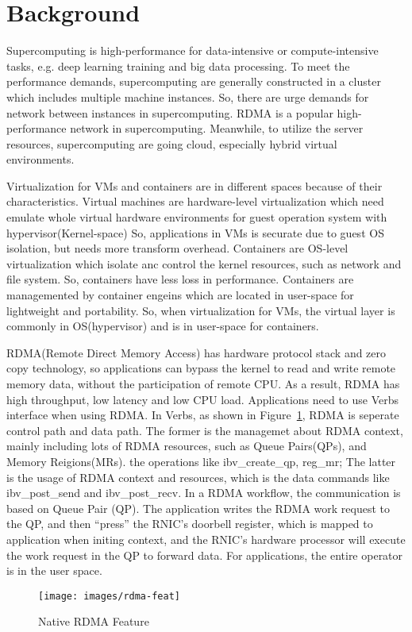 \section{Background}

Supercomputing is high-performance for data-intensive or compute-intensive tasks, e.g. deep learning training and big data processing. To meet the performance demands, supercomputing are generally constructed in a cluster which includes multiple machine instances. So, there are urge demands for network between instances in supercomputing. RDMA is a popular high-performance network in supercomputing. Meanwhile, to utilize the server resources, supercomputing are going cloud, especially hybrid virtual environments.

Virtualization for VMs and containers are in different spaces because of their characteristics. Virtual machines are hardware-level virtualization which need emulate whole virtual hardware environments for guest operation system with hypervisor(Kernel-space) So, applications in VMs is securate due to guest OS isolation, but needs more transform overhead. Containers are OS-level virtualization which isolate anc control the kernel resources, such as network and file system. So, containers have less loss in performance. Containers are managemented by container engeins which are located in user-space for lightweight and portability. So, when virtualization for VMs, the virtual layer is commonly in OS(hypervisor) and is in user-space for containers.

RDMA(Remote Direct Memory Access) has hardware protocol stack and zero copy technology, so applications can bypass the kernel to read and write remote memory data, without the participation of remote CPU. As a result, RDMA has high throughput, low latency and low CPU load. Applications need to use Verbs interface when using RDMA. In Verbs, as shown in Figure~\ref{fig:rdma-feat}, RDMA is seperate control path and data path. The former is the managemet about RDMA context, mainly including lots of RDMA resources, such as Queue Pairs(QPs), and Memory Reigions(MRs). the operations like ibv\_create\_qp, reg\_mr; The latter is the usage of RDMA context and resources,  which is the data commands like ibv\_post\_send and ibv\_post\_recv. In a RDMA workflow, the communication is based on Queue Pair (QP). The application writes the RDMA work request to the QP, and then ``press''  the RNIC's doorbell register, which is mapped to application when initing context, and the RNIC's hardware processor will execute the work request in the QP to forward data. For applications, the entire operator is in the user space.

\begin{figure}[!ht]
	\centering
	\texttt{[image: images/rdma-feat]}
	\caption{Native RDMA Feature}
	\label{fig:rdma-feat}
\end{figure}


